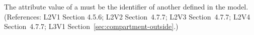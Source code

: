 The  attribute value of a \Compartment must be the identifier of
another \Compartment defined in the model.  (References: L2V1 Section
4.5.6; L2V2 Section~4.7.7; L2V3 Section~4.7.7; L2V4 Section~4.7.7; 
L3V1 Section~\ref{sec:compartment-outside}.)

